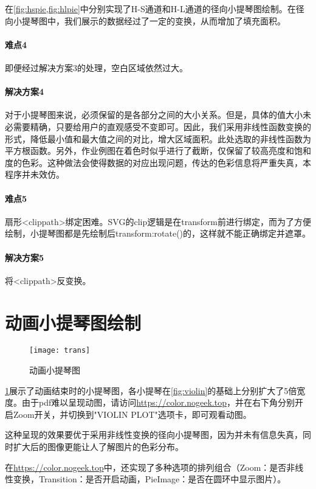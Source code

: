 \documentclass[a4paper,12pt]{article}
\begin{document}
    在\cref{fig:hspie,fig:hlpie}中分别实现了H-S通道和H-L通道的径向小提琴图绘制。在径向小提琴图中，我们展示的数据经过了一定的变换，从而增加了填充面积。

    \paragraph{难点4} 即便经过解决方案3的处理，空白区域依然过大。
    \paragraph{解决方案4} 对于小提琴图来说，必须保留的是各部分之间的大小关系。但是，具体的值大小未必需要精确，只要给用户的直观感受不变即可。因此，我们采用非线性函数变换的形式，降低最小值和最大值之间的对比，增大区域面积。此处选取的非线性函数为平方根函数。另外，作业例图在着色时似乎进行了截断，仅保留了较高亮度和饱和度的色彩。这种做法会使得数据的对应出现问题，传达的色彩信息将严重失真，本程序并未效仿。

    \paragraph{难点5} 扇形<clippath>绑定困难。SVG的clip逻辑是在transform前进行绑定，而为了方便绘制，小提琴图都是先绘制后transform:rotate()的，这样就不能正确绑定并遮罩。
    \paragraph{解决方案5} 将<clippath>反变换。
    \section{动画小提琴图绘制}
    \begin{figure}[htbp]
      \centering
      \texttt{[image: trans]}
      \caption{动画小提琴图}
      \label{fig:trans}
    \end{figure}

    \cref{fig:trans}展示了动画结束时的小提琴图，各小提琴在\cref{fig:violin}的基础上分别扩大了5倍宽度。由于pdf难以呈现动图，请访问\url{https://color.nogeek.top}，并在右下角分别开启Zoom开关，并切换到"VIOLIN PLOT"选项卡，即可观看动图。

    这种呈现的效果要优于采用非线性变换的径向小提琴图，因为并未有信息失真，同时扩大后的图像更能让人了解图片的色彩分布。

    在\url{https://color.nogeek.top}中，还实现了多种选项的排列组合（Zoom：是否非线性变换，Transition：是否开启动画，PieImage：是否在圆环中显示图片）。
\end{document}

